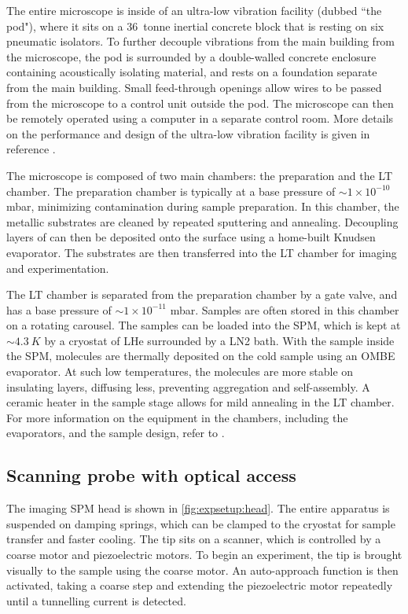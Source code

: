 The entire microscope is inside of an ultra-low vibration facility (dubbed ``the pod"), where it sits on a \SI{36}{tonne} inertial concrete block that is resting on six pneumatic isolators. To further decouple vibrations from the main building from the microscope, the pod is surrounded by a double-walled concrete enclosure containing acoustically isolating material, and rests on a foundation separate from the main building. Small feed-through openings allow wires to be passed from the microscope to a control unit outside the pod. The microscope can then be remotely operated using a computer in a separate control room. More details on the performance and design of the ultra-low vibration facility is given in reference \citep{macleod2015ultra}.

The microscope is composed of two main chambers: the preparation and the \acf{LT} chamber. The preparation chamber is typically at a base pressure of $\sim 1\times 10^{-10}$ mbar, minimizing contamination during sample preparation. In this chamber, the metallic substrates are cleaned by repeated sputtering and annealing. Decoupling layers of  can then be deposited onto the surface using a home-built Knudsen evaporator. The substrates are then transferred into the \ac{LT} chamber for imaging and experimentation.

The \ac{LT} chamber is separated from the preparation chamber by a gate valve, and has a base pressure of $\sim 1\times 10^{-11}$ mbar. Samples are often stored in this chamber on a rotating carousel. The samples can be loaded into the \ac{SPM}, which is kept at $\sim \SI{4.3}{K}$ by a cryostat of \acf{LHe} surrounded by a \acf{LN2} bath. With the sample inside the \ac{SPM}, molecules are thermally deposited on the cold sample using an \ac{OMBE} evaporator. At such low temperatures, the molecules are more stable on insulating  layers, diffusing less, preventing aggregation and self-assembly. A ceramic heater in the sample stage allows for mild annealing in the \ac{LT} chamber. For more information on the equipment in the chambers, including the evaporators, and the sample design, refer to \citep{cochrane2017single, roussy2016coupling}. 



\subsection{Scanning probe with optical access}

The imaging \ac{SPM} head is shown in \autoref{fig:expsetup:head}. The entire apparatus is suspended on damping springs, which can be clamped to the cryostat for sample transfer and faster cooling. The tip sits on a scanner, which is controlled by a coarse motor and piezoelectric motors. To begin an experiment, the tip is brought visually  to the sample using the coarse motor. An auto-approach function is then activated, taking a coarse step and extending the piezoelectric motor repeatedly until a tunnelling current is detected.


